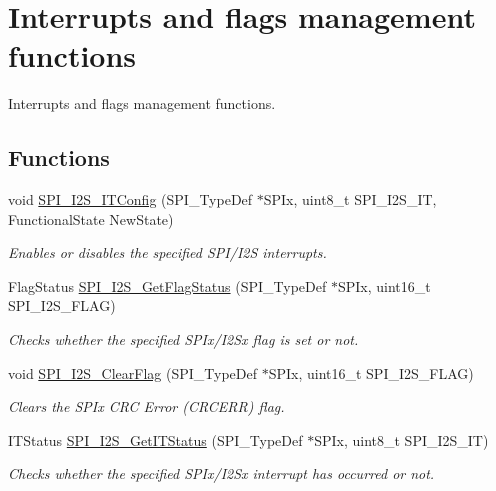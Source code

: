 \hypertarget{group___s_p_i___group5}{\section{Interrupts and flags management functions}
\label{group___s_p_i___group5}
}


Interrupts and flags management functions.  


\subsection*{Functions}
\begin{DoxyCompactItemize}
\item 
void \hyperlink{group___s_p_i___group5_ga17f4ef132e8ddbf94cb6b1688d181e41}{S\-P\-I\-\_\-\-I2\-S\-\_\-\-I\-T\-Config} (S\-P\-I\-\_\-\-Type\-Def $\ast$S\-P\-Ix, uint8\-\_\-t S\-P\-I\-\_\-\-I2\-S\-\_\-\-I\-T, Functional\-State New\-State)
\begin{DoxyCompactList}\small\item\em Enables or disables the specified S\-P\-I/\-I2\-S interrupts. \end{DoxyCompactList}\item 
Flag\-Status \hyperlink{group___s_p_i___group5_ga1bd785d129e09c5734a876c8f2767204}{S\-P\-I\-\_\-\-I2\-S\-\_\-\-Get\-Flag\-Status} (S\-P\-I\-\_\-\-Type\-Def $\ast$S\-P\-Ix, uint16\-\_\-t S\-P\-I\-\_\-\-I2\-S\-\_\-\-F\-L\-A\-G)
\begin{DoxyCompactList}\small\item\em Checks whether the specified S\-P\-Ix/\-I2\-Sx flag is set or not. \end{DoxyCompactList}\item 
void \hyperlink{group___s_p_i___group5_ga3aabd9e2437e213056c0ed9bdfa1a724}{S\-P\-I\-\_\-\-I2\-S\-\_\-\-Clear\-Flag} (S\-P\-I\-\_\-\-Type\-Def $\ast$S\-P\-Ix, uint16\-\_\-t S\-P\-I\-\_\-\-I2\-S\-\_\-\-F\-L\-A\-G)
\begin{DoxyCompactList}\small\item\em Clears the S\-P\-Ix C\-R\-C Error (C\-R\-C\-E\-R\-R) flag. \end{DoxyCompactList}\item 
I\-T\-Status \hyperlink{group___s_p_i___group5_ga72decbc1cd79f8fad92a2204beca6bc5}{S\-P\-I\-\_\-\-I2\-S\-\_\-\-Get\-I\-T\-Status} (S\-P\-I\-\_\-\-Type\-Def $\ast$S\-P\-Ix, uint8\-\_\-t S\-P\-I\-\_\-\-I2\-S\-\_\-\-I\-T)
\begin{DoxyCompactList}\small\item\em Checks whether the specified S\-P\-Ix/\-I2\-Sx interrupt has occurred or not. \end{DoxyCompactList}\item 

\end{DoxyCompactItemize}
